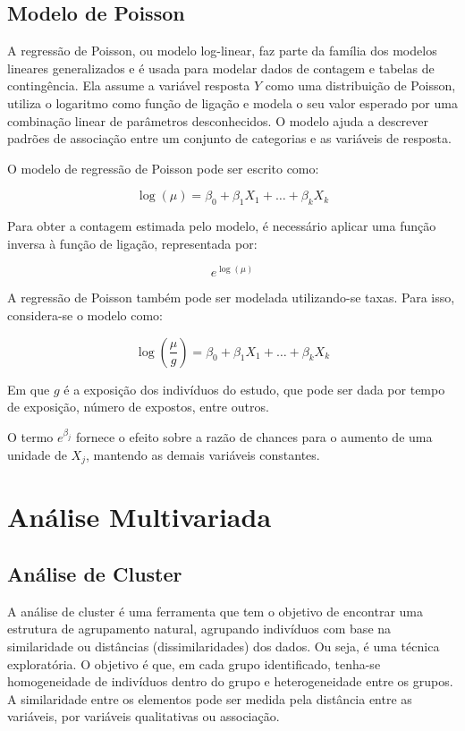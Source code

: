 \documentclass[
]{estat/estat}
\begin{document}
\subsection{Modelo de Poisson}\label{modelo-de-poisson}

A regressão de Poisson, ou modelo log-linear, faz parte da família dos
modelos lineares generalizados e é usada para modelar dados de contagem
e tabelas de contingência. Ela assume a variável resposta \(Y\) como uma
distribuição de Poisson, utiliza o logaritmo como função de ligação e
modela o seu valor esperado por uma combinação linear de parâmetros
desconhecidos. O modelo ajuda a descrever padrões de associação entre um
conjunto de categorias e as variáveis de resposta.

O modelo de regressão de Poisson pode ser escrito como:

\[
\log(\mu) = \beta_0 + \beta_1 X_1 + \ldots + \beta_k X_k
\]

Para obter a contagem estimada pelo modelo, é necessário aplicar uma
função inversa à função de ligação, representada por:

\[
e^{\log(\mu)}
\]

A regressão de Poisson também pode ser modelada utilizando-se taxas.
Para isso, considera-se o modelo como:

\[
\log\left(\frac{\mu}{g}\right) = \beta_0 + \beta_1 X_1 + \ldots + \beta_k X_k
\]

Em que \(g\) é a exposição dos indivíduos do estudo, que pode ser dada
por tempo de exposição, número de expostos, entre outros.

O termo \(e^{\beta_j}\) fornece o efeito sobre a razão de chances para o
aumento de uma unidade de \(X_j\), mantendo as demais variáveis
constantes.

\section{Análise Multivariada}\label{anuxe1lise-multivariada}

\subsection{Análise de Cluster}\label{anuxe1lise-de-cluster}

A análise de cluster é uma ferramenta que tem o objetivo de encontrar
uma estrutura de agrupamento natural, agrupando indivíduos com base na
similaridade ou distâncias (dissimilaridades) dos dados. Ou seja, é uma
técnica exploratória. O objetivo é que, em cada grupo identificado,
tenha-se homogeneidade de indivíduos dentro do grupo e heterogeneidade
entre os grupos. A similaridade entre os elementos pode ser medida pela
distância entre as variáveis, por variáveis qualitativas ou associação.
\end{document}
